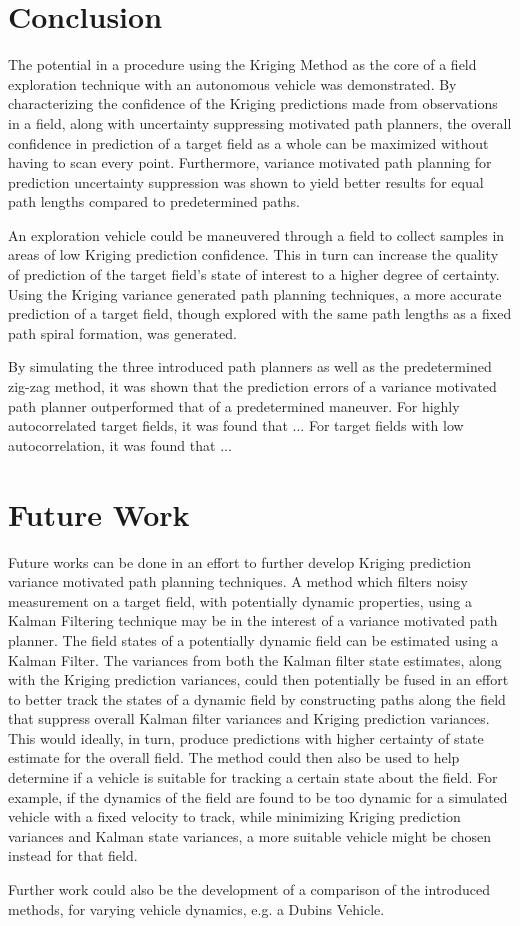 \chapter*{Conclusion}
The potential in a procedure using the Kriging Method as the core of a field exploration technique with an autonomous vehicle was demonstrated. By characterizing the confidence of the Kriging predictions made from observations in a field, along with uncertainty suppressing motivated path planners, the overall confidence in prediction of a target field as a whole can be maximized without having to scan every point. Furthermore, variance motivated path planning for prediction uncertainty suppression was shown to yield better results for equal path lengths compared to predetermined paths.

An exploration vehicle could be maneuvered through a field to collect samples in areas of low Kriging prediction confidence. This in turn can increase the quality of prediction of the target field's state of interest to a higher degree of certainty. Using the Kriging variance generated path planning techniques, a more accurate prediction of a target field, though explored with the same path lengths as a fixed path spiral formation, was generated. 

By simulating the three introduced path planners as well as the predetermined zig-zag method, it was shown that the prediction errors of a variance motivated path planner outperformed that of a predetermined maneuver. For highly autocorrelated target fields, it was found that ... For target fields with low autocorrelation, it was found that ...

\chapter*{Future Work}
Future works can be done in an effort to further develop Kriging prediction variance motivated path planning techniques. A method which filters noisy measurement on a target field, with potentially dynamic properties, using a Kalman Filtering technique may be in the interest of a variance motivated path planner. The field states of a potentially dynamic field can be estimated using a Kalman Filter. The variances from both the Kalman filter state estimates, along with the Kriging prediction variances, could then potentially be fused in an effort to better track the states of a dynamic field by constructing paths along the field that suppress overall Kalman filter variances and Kriging prediction variances. This would ideally, in turn, produce predictions with higher certainty of state estimate for the overall field. The method could then also be used to help determine if a vehicle is suitable for tracking a certain state about the field. For example, if the dynamics of the field are found to be too dynamic for a simulated vehicle with a fixed velocity to track, while minimizing Kriging prediction variances and Kalman state variances, a more suitable vehicle might be chosen instead for that field.

Further work could also be the development of a comparison of the introduced methods, for varying vehicle dynamics, e.g. a Dubins Vehicle.